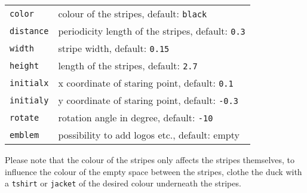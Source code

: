 \documentclass[parskip=half]{scrartcl}
\begin{document}
\begin{tabular}{@{}ll@{}}
	\lstinline|color|			& colour of the stripes, default: 		
													\lstinline|black| \\
  \lstinline|distance|	&	periodicity length of the stripes, default: 
  												 \lstinline|0.3| \\
  \lstinline|width|			&	stripe width, default: \lstinline|0.15| \\ 
  \lstinline|height|		&	length of the stripes, default: 
  												\lstinline|2.7| \\
  \lstinline|initialx|	&	x coordinate of staring point, default: 
  												\lstinline|0.1| \\
  \lstinline|initialy|	&	y coordinate of staring point, default: 
  												\lstinline|-0.3| \\
  \lstinline|rotate|		&	rotation angle in degree, default:
  												\lstinline|-10|\\
  \lstinline|emblem|		& possibility to add logos etc., default: empty\\
\end{tabular}

Please note that the colour of the stripes only affects the stripes themselves, to influence the colour of the empty space between the stripes, clothe the duck with a \lstinline|tshirt| or \lstinline|jacket| of the desired colour underneath the stripes.
\end{document}

